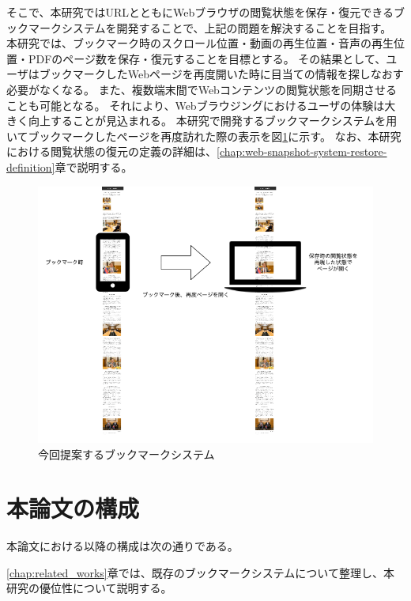 そこで、本研究ではURLとともにWebブラウザの閲覧状態を保存・復元できるブックマークシステムを開発することで、上記の問題を解決することを目指す。
本研究では、ブックマーク時のスクロール位置・動画の再生位置・音声の再生位置・PDFのページ数を保存・復元することを目標とする。
その結果として、ユーザはブックマークしたWebページを再度開いた時に目当ての情報を探しなおす必要がなくなる。
また、複数端末間でWebコンテンツの閲覧状態を同期させることも可能となる。
それにより、Webブラウジングにおけるユーザの体験は大きく向上することが見込まれる。
本研究で開発するブックマークシステムを用いてブックマークしたページを再度訪れた際の表示を図\ref{fig:ideal-scroll-position}に示す。
なお、本研究における閲覧状態の復元の定義の詳細は、\ref{chap:web-snapshot-system-restore-definition}章で説明する。

\begin{figure}[htbp]
  \label{fig:ideal-scroll-position}
  \begin{center}
    \includegraphics[bb=0 0 681 641,width=15cm]{img/010_introduction/ideal-scroll-position.pdf}
  \end{center}
  \caption{今回提案するブックマークシステム}
\end{figure}

\section{本論文の構成}

本論文における以降の構成は次の通りである。

\ref{chap:related_works}章では、既存のブックマークシステムについて整理し、本研究の優位性について説明する。

